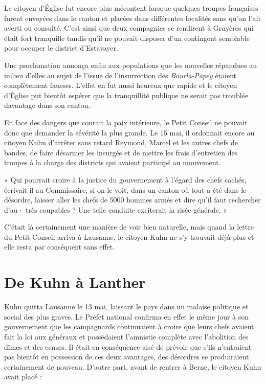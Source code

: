 \documentclass[french,twoside]{book} %
\newenvironment{quoteblock}%
  {\begin{quoting}}
  {\end{quoting}}
\newenvironment{quotebar}{%
    \def\FrameCommand{{\color{rubric!10!}\vrule width 0.5em} \hspace{0.9em}}%
    \def\OuterFrameSep{\itemsep} %
    \MakeFramed {\advance\hsize-\width \FrameRestore}
  }%
  {%
    \endMakeFramed
  }
\renewenvironment{quoteblock}%
  {%
    \savenotes
    \setstretch{0.9}
    \begin{quotebar}
  }
  {%
    \end{quotebar}
    \spewnotes
  }
\begin{document}
\noindent Le citoyen d’Église fut encore plus mécontent lorsque quelques troupes françaises furent envoyées dans le canton et placées dans différentes localités sans qu’on l’ait averti ou consulté. C’est ainsi que deux compagnies se rendirent à Gruyères qui était fort tranquille tandis qu’il ne pouvait disposer d’un contingent semblable pour occuper le district d’Estavayer.\par
Une proclamation annonça enfin aux populations que les nouvelles répandues au milieu d’elles au sujet de l’issue de l’insurrection des \emph{Bourla-Papey} étaient complètement fausses. L’effet en fut aussi heureux que rapide et le citoyen d’Église put bientôt espérer que la tranquillité publique ne serait pas troublée davantage dans son canton.\par
En face des dangers que courait la paix intérieure, le Petit Conseil ne pouvait donc que demander la sévérité la plus grande. Le 15 mai, il ordonnait encore au citoyen Kuhn d’arrêter sans retard Reymond, Marcel et les autres chefs de bandes, de faire désarmer les insurgés et de mettre les frais d’entretien des troupes à la charge des districts qui avaient participé au mouvement.\par

\begin{quoteblock}
 \noindent « Qui pourrait croire à la justice du gouvernement à l’égard des chefs cachés, écrivait-il au Commissaire, si on le voit, dans un canton où tout a été dans le désordre, laisser aller les chefs de 5000 hommes armés et dire qu’il faut rechercher d’au· très coupables ? Une telle conduite exciterait la risée générale. »
 \end{quoteblock}

\noindent C’était là certainement une manière de voir bien naturelle, mais quand la lettre du Petit Conseil arriva à Lausanne, le citoyen Kuhn ne s’y trouvait déjà plus et elle resta par conséquent sans effet.
\section[De Kuhn à Lanther]{De Kuhn à Lanther}
\noindent Kuhn quitta Lausanne le 13 mai, laissant le pays dans un malaise politique et social des plus graves. Le Préfet national confirma en effet le même jour à son gouvernement que les campagnards continuaient à croire que leurs chefs avaient fait la loi aux généraux et possédaient l’amnistie complète avec l’abolition des dîmes et des censes. Il était en conséquence aisé de prévoir que s’ils n’entraient pas bientôt en possession de ces deux avantages, des désordres se produiraient certainement de nouveau. D’autre part, avant de rentrer à Berne, le citoyen Kuhn avait placé :\par
\end{document}
